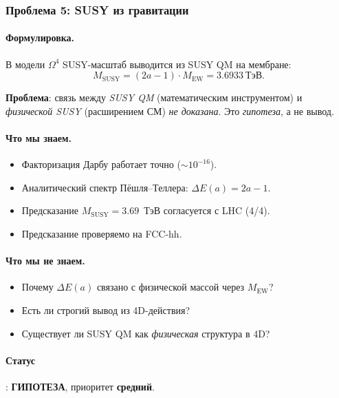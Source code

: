 \documentclass[11pt,a4paper]{article}
\newcommand{\Om}{\ensuremath{\Omega^4}}
\theoremstyle{definition}
\begin{document}
\subsubsection{Проблема 5: SUSY из гравитации}

\paragraph{Формулировка.}
В модели $\Om$ SUSY-масштаб выводится из SUSY QM на
мембране:
\begin{equation}
    M_{\text{SUSY}} = (2a - 1) \cdot M_{\text{EW}} = 3.6933~\text{ТэВ}.
\end{equation}

\medskip\noindent
\textbf{Проблема}: связь между \emph{SUSY QM} (математическим
инструментом) и \emph{физической SUSY} (расширением СМ)
\emph{не доказана}. Это \emph{гипотеза}, а не вывод.

\paragraph{Что мы знаем.}
\begin{itemize}
    \item Факторизация Дарбу работает точно ($\sim 10^{-16}$).
    \item Аналитический спектр Пёшля--Теллера:
          $\Delta E(a) = 2a - 1$.
    \item Предсказание $M_{\text{SUSY}} = 3.69$~ТэВ
          согласуется с LHC (4/4).
    \item Предсказание проверяемо на FCC-hh.
\end{itemize}

\paragraph{Что мы не знаем.}
\begin{itemize}
    \item Почему $\Delta E(a)$ связано с физической массой
          через $M_{\text{EW}}$?
    \item Есть ли строгий вывод из 4D-действия?
    \item Существует ли SUSY QM как \emph{физическая} структура
          в 4D?
\end{itemize}

\paragraph{Статус}: \textbf{ГИПОТЕЗА}, приоритет \textbf{средний}.
\end{document}
